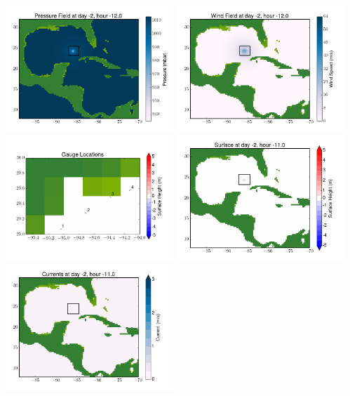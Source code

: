\documentclass[11pt]{article}
\begin{document}
\includegraphics[width=0.475\textwidth]{frame0012fig8.png}
\vskip 10pt 
\includegraphics[width=0.475\textwidth]{frame0012fig9.png}
\includegraphics[width=0.475\textwidth]{frame0012fig10.png}
\vskip 10pt 
\includegraphics[width=0.475\textwidth]{frame0013fig1.png}
\includegraphics[width=0.475\textwidth]{frame0013fig2.png}
\end{document}
